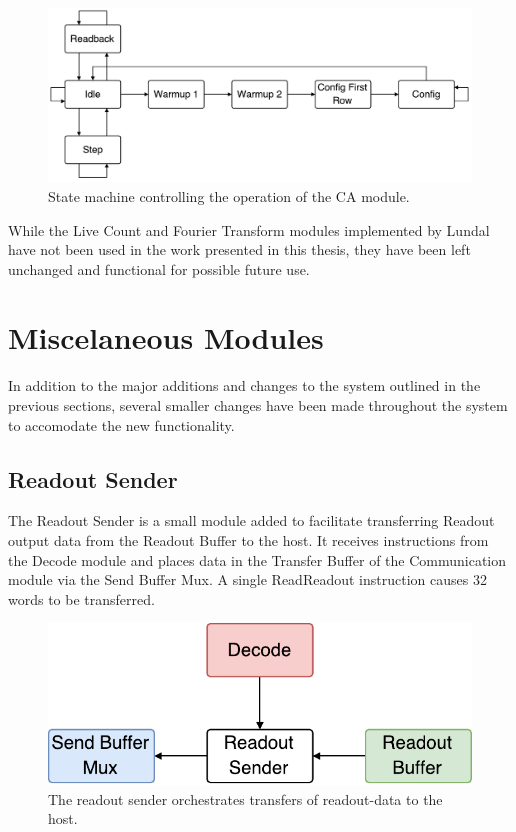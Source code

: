 \begin{figure}[ht]
  \centering
  \includegraphics[width=0.8\linewidth]{fig/ca-fsm}
  \caption[CA state machine]{State machine controlling the operation of the CA module.}
  \label{fig:ca-fsm}
\end{figure}

While the Live Count and Fourier Transform modules implemented by Lundal have
not been used in the work presented in this thesis, they have been left
unchanged and functional for possible future use.

\section{Miscelaneous Modules}
\label{sec:misc-modules}

In addition to the major additions and changes to the system outlined in the
previous sections, several smaller changes have been made throughout the system
to accomodate the new functionality.

\subsection{Readout Sender}

The Readout Sender is a small module added to facilitate transferring Readout
output data from the Readout Buffer to the host. It receives instructions from
the Decode module and places data in the Transfer Buffer of the Communication
module via the Send Buffer Mux. A single ReadReadout instruction causes 32 words
to be transferred.

\begin{figure}[ht]
  \centering
  \includegraphics[width=0.5\linewidth]{fig/readout-sender}
  \caption[Readout Sender]{The readout sender orchestrates transfers of
    readout-data to the host.}
  \label{fig:readout-sender}
\end{figure}


